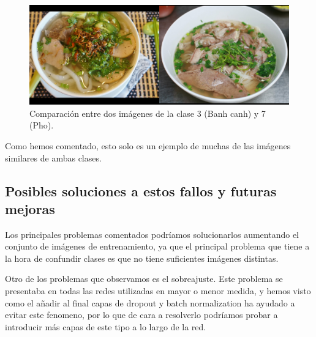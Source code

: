 \begin{figure}[H]
  \centering
  \includegraphics[width=1\linewidth]{Imagenes/cmp-c7-c3.png}
  \caption{Comparación entre dos imágenes de la clase 3 (Banh canh) y 7 (Pho).}
\end{figure}


Como hemos comentado, esto solo es un ejemplo de muchas de las imágenes similares de ambas clases.

\subsection{Posibles soluciones a estos fallos y futuras mejoras}

Los principales problemas comentados podríamos solucionarlos aumentando el conjunto de imágenes de entrenamiento, ya que el principal problema que tiene a la hora de confundir clases es que no tiene suficientes imágenes distintas.

Otro de los problemas que observamos es el sobreajuste. Este problema se presentaba en todas las redes utilizadas en mayor o menor medida, y hemos visto como el añadir al final capas de dropout y batch normalization ha ayudado a evitar este fenomeno, por lo que de cara a resolverlo podríamos probar a introducir más capas de este tipo a lo largo de la red.
